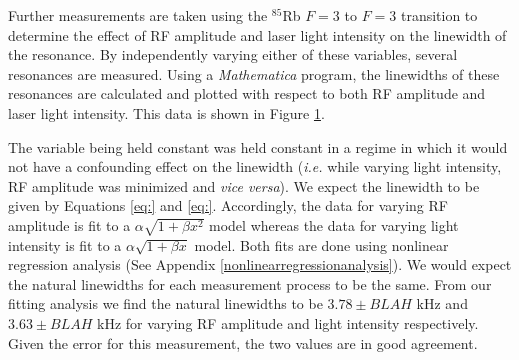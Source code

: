 Further measurements are taken using the $^{85}$Rb $F=3$ to $F=3$ transition to determine the effect of RF amplitude and laser light intensity on the linewidth of the resonance. By independently varying either of these variables, several resonances are measured.  Using a \emph{Mathematica} program, the linewidths of these resonances are calculated and plotted with respect to both RF amplitude and laser light intensity.  This data is shown in Figure \ref{fig:linewidths}.
\begin{figure}[h!]
\begin{center}
\hspace{-1mm}
\vspace{-2mm}
\vspace{-2mm}
\caption{\small{}}
\label{fig:linewidths}
\end{center}
\end{figure}
The variable being held constant was held constant in a regime in which it would not have a confounding effect on the linewidth (\emph{i.e.} while varying light intensity, RF amplitude was minimized and \emph{vice versa}).  We expect the linewidth to be given by 
Equations \ref{eq:} and \ref{eq:}. Accordingly, the data for varying RF amplitude is fit to a $\alpha \sqrt{1+\beta x^2}$ model whereas the data for varying light intensity is fit to a $\alpha \sqrt{1+\beta x}$ model.  Both fits are done using nonlinear regression analysis (See Appendix \ref{nonlinearregressionanalysis}).  We would expect the natural linewidths for each measurement process to be the same.  From our fitting analysis we find the natural linewidths to be $3.78 \pm BLAH$ kHz and $3.63 \pm BLAH$ kHz for varying RF amplitude and light intensity respectively.  Given the error for this measurement, the two values are in good agreement. 


